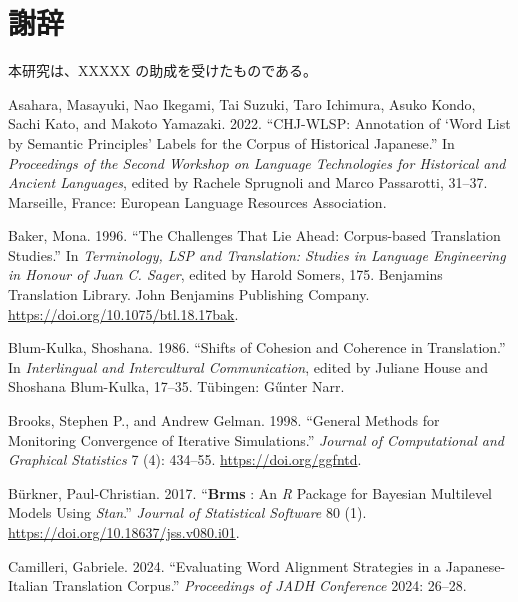 \documentclass[
  letterpaper,
  DIV=11,
  numbers=noendperiod]{scrartcl}
\newlength{\cslhangindent}
\newenvironment{CSLReferences}[2] %
 {\begin{list}{}{%
  \setlength{\itemindent}{0pt}
  \setlength{\leftmargin}{0pt}
  \setlength{\parsep}{0pt}
  \ifodd #1
   \setlength{\leftmargin}{\cslhangindent}
   \setlength{\itemindent}{-1\cslhangindent}
  \fi
  \setlength{\itemsep}{#2\baselineskip}}}
 {\end{list}}
\begin{document}
\section*{謝辞}\label{ux8b1dux8f9e}

本研究は、XXXXX の助成を受けたものである。

\label{refs}
\begin{CSLReferences}{1}{0}
Asahara, Masayuki, Nao Ikegami, Tai Suzuki, Taro Ichimura, Asuko Kondo,
Sachi Kato, and Makoto Yamazaki. 2022. {``{CHJ-WLSP}: {Annotation} of
{`{Word List} by {Semantic Principles}'} {Labels} for the {Corpus} of
{Historical Japanese}.''} In \emph{Proceedings of the {Second Workshop}
on {Language Technologies} for {Historical} and {Ancient Languages}},
edited by Rachele Sprugnoli and Marco Passarotti, 31--37. Marseille,
France: European Language Resources Association.

Baker, Mona. 1996. {``The Challenges That Lie Ahead: {Corpus-based}
Translation Studies.''} In \emph{Terminology, {LSP} and {Translation}:
{Studies} in Language Engineering in Honour of {Juan C}. {Sager}},
edited by Harold Somers, 175. Benjamins {Translation Library}. John
Benjamins Publishing Company.
\url{https://doi.org/10.1075/btl.18.17bak}.

Blum-Kulka, Shoshana. 1986. {``Shifts of {Cohesion} and {Coherence} in
{Translation}.''} In \emph{Interlingual and {Intercultural
Communication}}, edited by Juliane House and Shoshana Blum-Kulka,
17--35. T{ü}bingen: G{ű}nter Narr.

Brooks, Stephen P., and Andrew Gelman. 1998. {``General {Methods} for
{Monitoring Convergence} of {Iterative Simulations}.''} \emph{Journal of
Computational and Graphical Statistics} 7 (4): 434--55.
\url{https://doi.org/ggfntd}.

Bürkner, Paul-Christian. 2017. {``{\textbf{Brms}} : {An} {\emph{R}}
{Package} for {Bayesian Multilevel Models Using} {\emph{Stan}}.''}
\emph{Journal of Statistical Software} 80 (1).
\url{https://doi.org/10.18637/jss.v080.i01}.

Camilleri, Gabriele. 2024. {``Evaluating {Word Alignment Strategies} in
a {Japanese-Italian Translation Corpus}.''} \emph{Proceedings of JADH
Conference} 2024: 26--28.


\end{CSLReferences}
\end{document}
